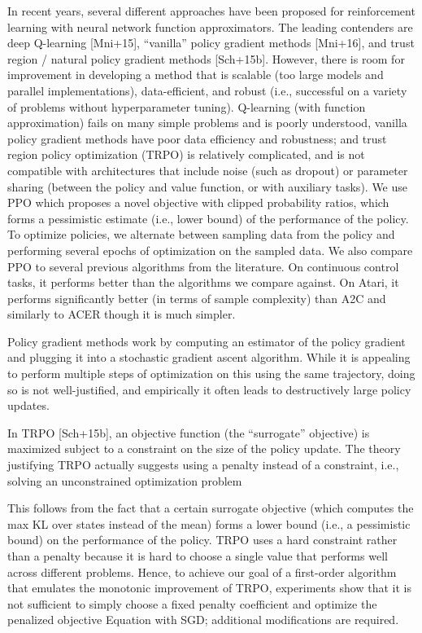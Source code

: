 \documentclass[conference]{IEEEtran}
\begin{document}
In recent years, several different approaches have been proposed for reinforcement learning with neural network function approximators. The leading contenders are deep Q-learning [Mni+15], “vanilla” policy gradient methods [Mni+16], and trust region / natural policy gradient methods [Sch+15b]. However, there is room for improvement in developing a method that is scalable (too large models and parallel implementations), data-efficient, and robust (i.e., successful on a variety of problems without hyperparameter tuning). Q-learning (with function approximation) fails on many simple problems and is poorly understood, vanilla policy gradient methods have poor data efficiency and robustness; and trust region policy optimization (TRPO) is relatively complicated, and is not compatible with architectures that include noise (such as dropout) or parameter sharing (between the policy and value function, or with auxiliary tasks). We use PPO which proposes a novel objective with clipped probability ratios, which forms a pessimistic estimate (i.e., lower bound) of the performance of the policy. To optimize policies, we alternate between sampling data from the policy and performing several epochs of optimization on the sampled data. We also compare PPO to several previous algorithms from the literature. On continuous control tasks, it performs better than the algorithms we compare against. On Atari, it performs significantly better (in terms of sample complexity) than A2C and similarly to ACER though it is much simpler.

Policy gradient methods work by computing an estimator of the policy gradient and plugging it into a stochastic gradient ascent algorithm. While it is appealing to perform multiple steps of optimization on this using the same trajectory, doing so is not well-justified, and empirically it often leads to destructively large policy updates.

In TRPO [Sch+15b], an objective function (the “surrogate” objective) is maximized subject to a constraint on the size of the policy update. The theory justifying TRPO actually suggests using a penalty instead of a constraint, i.e., solving an unconstrained optimization problem

This follows from the fact that a certain surrogate objective (which computes the max KL over states instead of the mean) forms a lower bound (i.e., a pessimistic bound) on the performance of the policy. TRPO uses a hard constraint rather than a penalty because it is hard to choose a single value that performs well across different problems. Hence, to achieve our goal of a first-order algorithm that emulates the monotonic improvement of TRPO, experiments show that it is not sufficient to simply choose a fixed penalty coefficient and optimize the penalized objective Equation with SGD; additional modifications are required.
\end{document}

